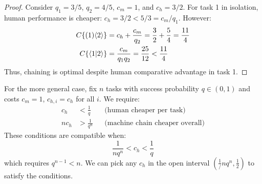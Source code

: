 \documentclass{article}
\begin{document}
\begin{proof}
Consider $q_1 = 3/5$, $q_2 = 4/5$, $c_m = 1$, and $c_h = 3/2$.
For task 1 in isolation, human performance is cheaper: $c_h = 3/2 < 5/3 = c_m/q_1$.
However:
\begin{align*}
    C\{ ( 1 )\langle 2 \rangle \} &= c_h + \frac{c_m}{q_2} = \frac{3}{2} + \frac{5}{4} = \frac{11}{4} \\
    C\{ \langle 1|2 \rangle \} &= \frac{c_m}{q_1q_2} = \frac{25}{12} < \frac{11}{4}
\end{align*}
Thus, chaining is optimal despite human comparative advantage in task 1.
\end{proof}

For the more general case, fix $n$ tasks with success probability $q \in (0,1)$ and costs $c_m = 1$, $c_{h,i} = c_h$ for all $i$.
We require:
\begin{align*}
c_h &< \frac{1}{q} && \text{(human cheaper per task)} \\
n c_h &> \frac{1}{q^n} && \text{(machine chain cheaper overall)}
\end{align*}
These conditions are compatible when:
\[
\frac{1}{n q^n} < c_h < \frac{1}{q}
\]
which requires $q^{n-1} < n$.
We can pick any $c_h$ in the open interval $(\frac{1}/{nq^n}, \frac{1}{2})$ to satisfy the conditions.
\end{document}
